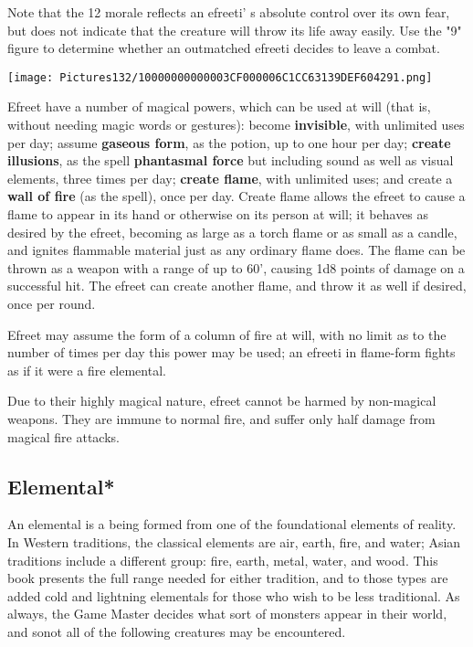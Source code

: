\documentclass[a4paper,twoside,openany,10pt]{book}
\begin{document}
\begin{multicols}{2}
Note that the 12 morale reflects an efreeti' s absolute control over its own fear, but does not indicate that the creature will throw its life away easily. Use the "9" figure to determine whether an outmatched efreeti decides to leave a combat.


\begin{center}
	\texttt{[image: Pictures132/10000000000003CF000006C1CC63139DEF604291.png]}
\end{center}

Efreet have a number of magical powers, which can be used at will (that is, without needing magic words or gestures): become \textbf{invisible}, with unlimited uses per day; assume \textbf{gaseous form}, as the potion, up to one hour per day; \textbf{create illusions}, as the spell \textbf{phantasmal force} but including sound as well as visual elements, three times per day; \textbf{create flame}, with unlimited uses; and create a \textbf{wall of fire }(as the spell), once per day. Create flame allows the efreet to cause a flame to appear in its hand or otherwise on its person at will; it behaves as desired by the efreet, becoming as large as a torch flame or as small as a candle, and ignites flammable material just as any ordinary flame does. The flame can be thrown as a weapon with a range of up to 60', causing 1d8 points of damage on a successful hit. The efreet can create another flame, and throw it as well if desired, once per round.

Efreet may assume the form of a column of fire at will, with no limit as to the number of times per day this power may be used; an efreeti in flame-form fights as if it were a fire elemental.

Due to their highly magical nature, efreet cannot be harmed by non-magical weapons. They are immune to normal fire, and suffer only half damage from magical fire attacks.


\subsection*{Elemental*}\label{elemental}

An elemental is a being formed from one of the foundational elements of reality. In Western traditions, the classical elements are air, earth, fire, and water; Asian traditions include a different group: fire, earth, metal, water, and wood. This book presents the full range needed for either tradition, and to those types are added cold and lightning elementals for those who wish to be less traditional. As always, the Game Master decides what sort of monsters appear in their world, and sonot all of the following creatures may be encountered.


\end{multicols}
\end{document}
